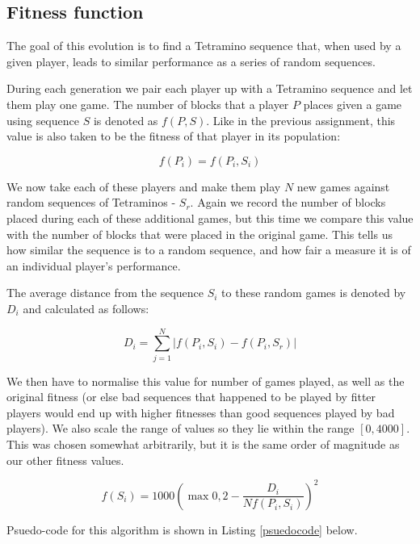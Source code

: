 \documentclass[a4paper,11pt]{article}
\begin{document}
\subsection{Fitness function}

The goal of this evolution is to find a Tetramino sequence that, when used by
a given player, leads to similar performance as a series of random sequences.

During each generation we pair each player up with a Tetramino sequence and let
them play one game.
The number of blocks that a player $P$ places given a game using sequence $S$
is denoted as $f(P, S)$.
Like in the previous assignment, this value is also taken to be the fitness of
that player in its population:

\begin{equation}
  f(P_i) = f(P_i, S_i)
\end{equation}

We now take each of these players and make them play $N$ new games against
random sequences of Tetraminos - $S_r$.
Again we record the number of blocks placed during each of these additional
games, but this time we compare this value with the number of blocks that were
placed in the original game.
This tells us how similar the sequence is to a random sequence, and how fair a
measure it is of an individual player's performance.

The average distance from the sequence $S_i$ to these random games is denoted
by $D_i$ and calculated as follows:

\begin {equation}
  D_i = \sum_{j=1}^{N} \left| f\left( P_i, S_i\right) - f\left( P_i, S_r \right) \right|
\end{equation}

We then have to normalise this value for number of games played, as well as the
original fitness (or else bad sequences that happened to be played by fitter
players would end up with higher fitnesses than good sequences played by bad
players).
We also scale the range of values so they lie within the range $[0, 4000]$.
This was chosen somewhat arbitrarily, but it is the same order of magnitude
as our other fitness values.

\begin{equation}
  f(S_i) = 1000 \left( \max 0, 2 - \frac{D_i}{ N f\left( P_i, S_i\right) } \right)^2
\end {equation}

Psuedo-code for this algorithm is shown in Listing \ref{psuedocode} below.
\end{document}
